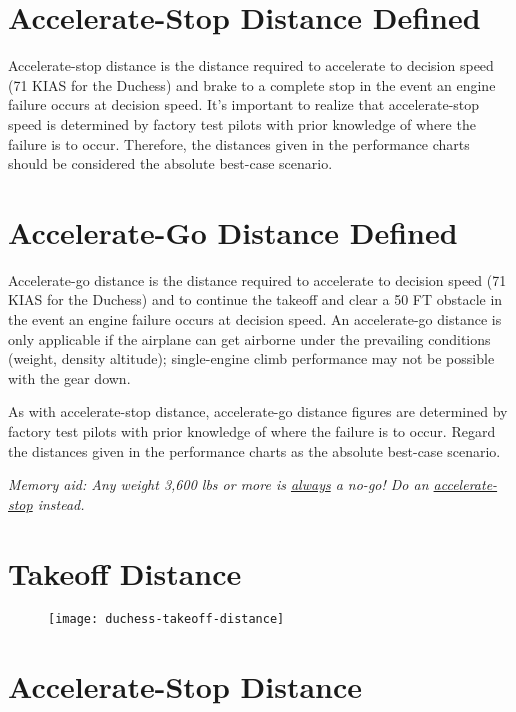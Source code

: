 {\section{Accelerate-Stop Distance Defined}

Accelerate-stop distance is the distance required to accelerate to decision speed (71 KIAS for the Duchess) and
brake to a complete stop in the event an engine failure occurs at decision speed. It’s important to realize that
accelerate-stop speed is determined by factory test pilots with prior knowledge of where the failure is to occur.
Therefore, the distances given in the performance charts should be considered the absolute best-case scenario.

\section{Accelerate-Go Distance Defined}

Accelerate-go distance is the distance required to accelerate to decision speed (71 KIAS for the Duchess) and to
continue the takeoff and clear a 50 FT obstacle in the event an engine failure occurs at decision speed. An
accelerate-go distance is only applicable if the airplane can get airborne under the prevailing conditions (weight,
density altitude); single-engine climb performance may not be possible with the gear down.

As with accelerate-stop distance, accelerate-go distance figures are determined by factory test pilots with prior
knowledge of where the failure is to occur. Regard the distances given in the performance charts as the absolute
best-case scenario.

\emph{Memory aid: Any weight 3,600 lbs or more is \underline{always} a no-go!
Do an \underline{accelerate-stop} instead.}

\section{Takeoff Distance}

\begin{figure}[H]
\begin{center}
\texttt{[image: duchess-takeoff-distance]}
\end{center}
\end{figure}

\section{Accelerate-Stop Distance}

}
